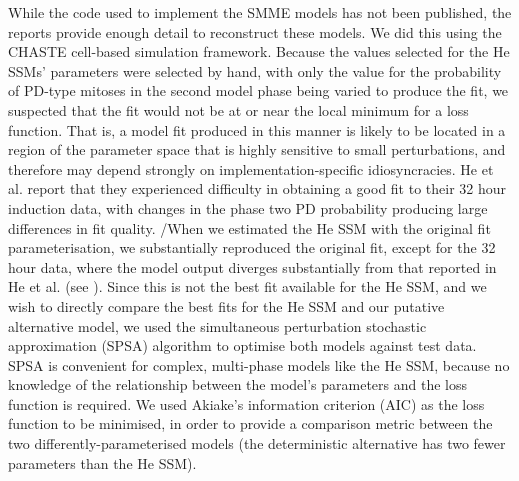 While the code used to implement the SMME models has not been published, the reports provide enough detail to reconstruct these models. We did this using the CHASTE cell-based simulation framework. Because the values selected for the He SSMs' parameters were selected by hand, with only the value for the probability of PD-type mitoses in the second model phase being varied to produce the fit, we suspected that the fit would not be at or near the local minimum for a loss function. That is, a model fit produced in this manner is likely to be located in a region of the parameter space that is highly sensitive to small perturbations, and therefore may depend strongly on implementation-specific idiosyncracies. He et al. report that they experienced difficulty in obtaining a good fit to their 32 hour induction data, with changes in the phase two PD probability producing large differences in fit quality. /When we estimated the He SSM with the original fit parameterisation, we substantially reproduced the original fit, except for the 32 hour data, where the model output diverges substantially from that reported in He et al. (see ). Since this is not the best fit available for the He SSM, and we wish to directly compare the best fits for the He SSM and our putative alternative model, we used the simultaneous perturbation stochastic approximation (SPSA) algorithm \cite{Spall1998} to optimise both models against test data. SPSA is convenient for complex, multi-phase models like the He SSM, because no knowledge of the relationship between the model's parameters and the loss function is required. We used Akiake's information criterion (AIC) as the loss function to be minimised, in order to provide a comparison metric between the two differently-parameterised models (the deterministic alternative has two fewer parameters than the He SSM). 

